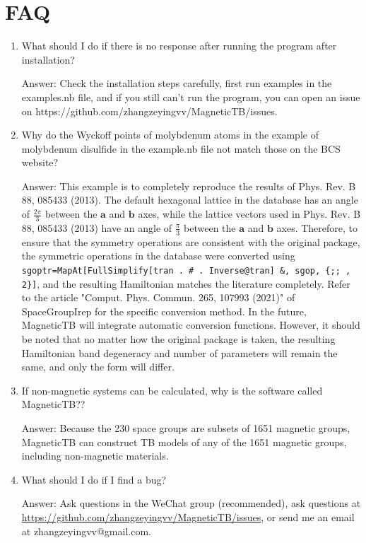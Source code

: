 \documentclass[titlepage,a4paper,12pt,AutoFakeBold]{article}
\newcommand\litem[1]{\item{ #1?\\}}
\begin{document}
\section{FAQ}
\begin{enumerate}[style=nextline]
	\setlength\itemsep{1.5em}
	\litem{What should I do if there is no response after running the program after installation}
	
	Answer: Check the installation steps carefully, first run examples in the examples.nb file, and if you still can't run the program, you can open an issue on https://github.com/zhangzeyingvv/MagneticTB/issues.
	
	\litem{Why do the Wyckoff points of molybdenum atoms in the example of molybdenum disulfide in the example.nb file not match those on the BCS website}
	
	Answer: This example is to completely reproduce the results of Phys. Rev. B 88, 085433 (2013). The default hexagonal lattice in the database has an angle of $\frac{2\pi}{3}$ between the $\boldsymbol{a}$ and $\boldsymbol{b}$ axes, while the lattice vectors used in Phys. Rev. B 88, 085433 (2013) have an angle of $\frac{\pi}{3}$ between the $\boldsymbol{a}$ and $\boldsymbol{b}$ axes. Therefore, to ensure that the symmetry operations are consistent with the original package, the symmetric operations in the database were converted using \lstinline|sgoptr=MapAt[FullSimplify[tran . # . Inverse@tran] &, sgop, {;; , 2}]|, and the resulting Hamiltonian matches the literature completely. Refer to the article "Comput. Phys. Commun. 265, 107993 (2021)" of \textsf{SpaceGroupIrep} for the specific conversion method. In the future, \textsf{MagneticTB} will integrate automatic conversion functions. However, it should be noted that no matter how the original package is taken, the resulting Hamiltonian band degeneracy and number of parameters will remain the same, and only the form will differ.
	
	\litem{If non-magnetic systems can be calculated, why is the software called \textsf{MagneticTB}?}
	
	Answer: Because the 230 space groups are subsets of 1651 magnetic groups, \textsf{MagneticTB} can construct TB models of any of the 1651 magnetic groups, including non-magnetic materials.
	
	\litem{What should I do if I find a bug}
	
	Answer: Ask questions in the WeChat group (recommended), ask questions at \url{https://github.com/zhangzeyingvv/MagneticTB/issues}, or send me an email at zhangzeyingvv@gmail.com.
	

\end{enumerate}
\end{document}
